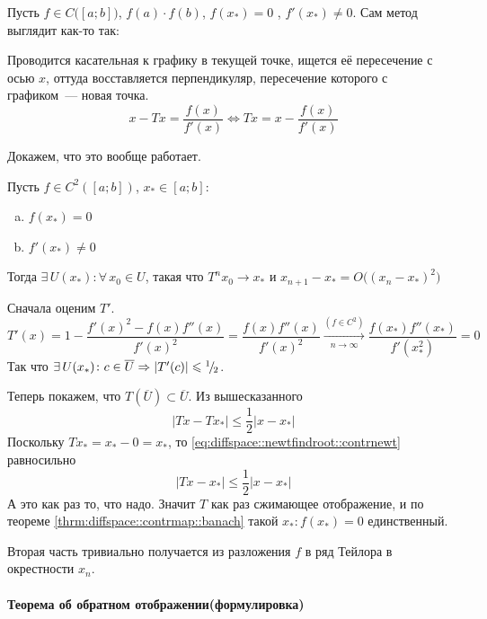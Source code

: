 \documentclass[12pt,timbord]{../../../notes}
\begin{document}
Пусть $f\in C\bigl([a;b]\bigr)$, $f(a)\cdot f(b)$, $f(x_*) = 0$ , $f'(x_*) \neq 0$. 
Сам метод выглядит как-то так:

\noindent
Проводится касательная к графику в текущей точке, ищется её пересечение с осью $x$, 
оттуда восставляется перпендикуляр, пересечение которого с графиком~--- новая точка.
\[
  x - T x = \frac{f(x)}{f'(x)} \Leftrightarrow Tx = x - \frac{f(x)}{f'(x)}
\]

Докажем, что это вообще работает.
\begin{thrm}\label{thrm:diffspace::newtfindroot}
  Пусть $f\in C^2\left([a;b]\right)$, $x_* \in [a;b]$:
  \begin{enumerate}[a)]
    \item $f(x_*) = 0$
    \item $f'(x_*) \neq 0$
  \end{enumerate}
  Тогда $\exists\, U(x_*) \colon \forall\, x_0 \in U$, такая что $T^n x_0 \to x_*$ и
  $x_{n+1} - x_* = O\bigl((x_n -x_*)^2\bigr)$
\end{thrm}
\begin{ittproof}
  Сначала оценим $T'$.
  \[
    T'(x) = 1 - \frac{f'(x)^2 - f(x)f''(x)}{f'(x)^2} = \frac{f(x)f''(x)}{f'(x)^2} 
    \xrightarrow[n\to \infty]{(f\in C^2)} \frac{f(x_*)f''(x_*)}{f'(x_*^2)} 
    = 0
  \]
  Так что $\exists\, U(x_*) \colon c \in \overline{U} \Rightarrow |T'(c)| \leqslant {}^{1}\!/_{\!2}$.
  
  Теперь покажем, что $T(\overline{U}) \subset \overline{U}$. Из вышесказанного
  \begin{equation}
    |Tx - Tx_*| \leqslant \frac{1}{2} |x-x_*|
    \label{eq:diffspace::newtfindroot::contrnewt}
  \end{equation}
  Поскольку $Tx_* = x_* - 0 = x_*$, то \eqref{eq:diffspace::newtfindroot::contrnewt} равносильно
  \[
    | Tx - x_* | \leqslant \frac{1}{2} |x-x_*| 
  \]
  А это как раз то, что надо. 
  Значит $T$ как раз сжимающее отображение, и  по теореме \ref{thrm:diffspace::contrmap::banach} 
  такой $x_*\colon f(x_*) = 0$ единственный.

  Вторая часть тривиально получается из разложения $f$ в ряд Тейлора в окрестности $x_n$.
\end{ittproof}

\paragraph{Теорема об обратном отображении(формулировка)}
\label{par:diffspace::invmaphandwave}
\end{document}
